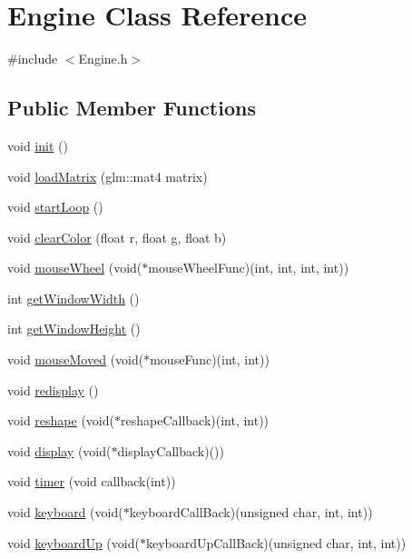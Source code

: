 \hypertarget{classEngine}{}\section{Engine Class Reference}
\label{classEngine}


{\ttfamily \#include $<$Engine.\+h$>$}

\subsection*{Public Member Functions}
\begin{DoxyCompactItemize}
\item 
void \hyperlink{classEngine_ae675127bbb7671464d1d7ad94818a17a}{init} ()
\item 
void \hyperlink{classEngine_a033a7a3b7697c9998270276bf659ac89}{load\+Matrix} (glm\+::mat4 matrix)
\item 
void \hyperlink{classEngine_af0255a9a3e166e47a13ecbba393956de}{start\+Loop} ()
\item 
void \hyperlink{classEngine_a74984091119dd2be987608dcc4ab46f6}{clear\+Color} (float r, float g, float b)
\item 
void \hyperlink{classEngine_a57d57550b28d0c5c3ae92fcbaf5dd82b}{mouse\+Wheel} (void($\ast$mouse\+Wheel\+Func)(int, int, int, int))
\item 
int \hyperlink{classEngine_aa9edd591eafe0975a95ab06f74b6ba03}{get\+Window\+Width} ()
\item 
int \hyperlink{classEngine_a483d0d99c1f762f0012aa649ec3220cf}{get\+Window\+Height} ()
\item 
void \hyperlink{classEngine_a649eaa6139ab7b66d2d5ac541ac2f069}{mouse\+Moved} (void($\ast$mouse\+Func)(int, int))
\item 
void \hyperlink{classEngine_ac12f3f0be76b8394772aeac4053ad2f2}{redisplay} ()
\item 
void \hyperlink{classEngine_af43e72719048ae70cb4c50c0b76c5ec7}{reshape} (void($\ast$reshape\+Callback)(int, int))
\item 
void \hyperlink{classEngine_a56fc665908ac6d6c4340864facc00760}{display} (void($\ast$display\+Callback)())
\item 
void \hyperlink{classEngine_a3f92d7e6ea9beeac958fcc243ee7d434}{timer} (void callback(int))
\item 
void \hyperlink{classEngine_a5ddd680e42a9c0a655af665611ddd279}{keyboard} (void($\ast$keyboard\+Call\+Back)(unsigned char, int, int))
\item 
void \hyperlink{classEngine_a2e7d54bf7a41c23afce2934967cf09de}{keyboard\+Up} (void($\ast$keyboard\+Up\+Call\+Back)(unsigned char, int, int))

\end{DoxyCompactItemize}
